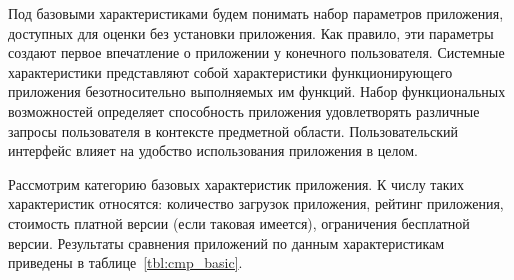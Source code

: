 Под базовыми характеристиками будем понимать набор параметров приложения,
доступных для оценки без установки приложения. Как правило, эти параметры
создают первое впечатление о приложении у конечного пользователя.
Системные характеристики представляют собой характеристики функционирующего
приложения безотносительно выполняемых им функций.
Набор функциональных возможностей определяет способность приложения
удовлетворять различные запросы пользователя в контексте предметной области.
Пользовательский интерфейс влияет на удобство использования приложения в целом.

Рассмотрим категорию базовых характеристик приложения.
К числу таких характеристик относятся:
количество загрузок приложения, рейтинг приложения,
стоимость платной версии (если таковая имеется), ограничения бесплатной версии.
Результаты сравнения приложений по данным характеристикам приведены
в таблице~\ref{tbl:cmp_basic}.

